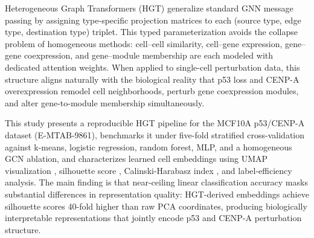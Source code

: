 Heterogeneous Graph Transformers (HGT) \citep{hu2020hgt} generalize standard GNN
message passing by assigning type-specific projection matrices to each
(source type, edge type, destination type) triplet.
This typed parameterization avoids the collapse problem of homogeneous methods:
cell--cell similarity, cell--gene expression, gene--gene coexpression, and
gene--module membership are each modeled with dedicated attention weights.
When applied to single-cell perturbation data, this structure aligns naturally
with the biological reality that p53 loss and CENP-A overexpression remodel
cell neighborhoods, perturb gene coexpression modules, and alter gene-to-module
membership simultaneously.

This study presents a reproducible HGT pipeline for the MCF10A p53/CENP-A
dataset (E-MTAB-9861), benchmarks it under five-fold stratified cross-validation
against k-means, logistic regression, random forest, MLP, and a homogeneous GCN
ablation, and characterizes learned cell embeddings using UMAP visualization
\citep{mcinnes2018umap}, silhouette score \citep{rousseeuw1987silhouette},
Calinski-Harabasz index \citep{calinski1974dendrite}, and label-efficiency
analysis.
The main finding is that near-ceiling linear classification accuracy masks
substantial differences in representation quality: HGT-derived embeddings achieve
silhouette scores 40-fold higher than raw PCA coordinates, producing
biologically interpretable representations that jointly encode p53 and CENP-A
perturbation structure.
